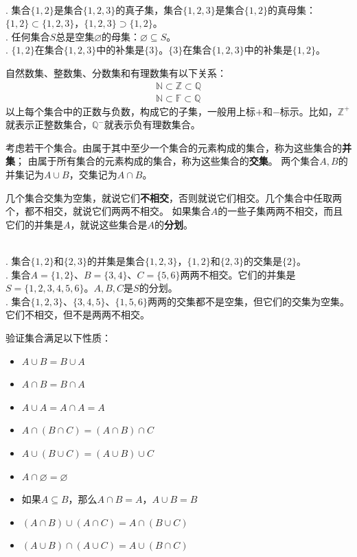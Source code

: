 \begin{ex}\label{ex:2-0-10}
    \mbox{} \\ 
    . 集合$\{1,2\}$是集合$\{1,2,3\}$的真子集，集合$\{1,2,3\}$是集合$\{1,2\}$的真母集：$\{1,2\}\subset \{1,2,3\}$，$\{1,2,3\}\supset \{1,2\}$。\\
    . 任何集合$S$总是空集$\varnothing$的母集：$\varnothing \subseteq S$。\\
    . $\{1,2\}$在集合$\{1,2,3\}$中的补集是$\{3\}$。$\{3\}$在集合$\{1,2,3\}$中的补集是$\{1,2\}$。
\end{ex}

自然数集、整数集、分数集和有理数集有以下关系：
\begin{align*}
    \mathbb{N}\subset\mathbb{Z}\subset\mathbb{Q}  \\
    \mathbb{N}\subset\mathbb{F}\subset\mathbb{Q} 
\end{align*}
以上每个集合中的正数与负数，构成它的子集，一般用上标$+$和$-$标示。比如，$\mathbb{Z}^+$就表示正整数集合，$\mathbb{Q}^-$就表示负有理数集合。

考虑若干个集合。由属于其中至少一个集合的元素构成的集合，称为这些集合的\textbf{并集}；
由属于所有集合的元素构成的集合，称为这些集合的\textbf{交集}。
两个集合$A, B$的并集记为$A\cup B$，交集记为$A\cap B$。

几个集合交集为空集，就说它们\textbf{不相交}，否则就说它们相交。几个集合中任取两个，都不相交，就说它们两两不相交。
如果集合$A$的一些子集两两不相交，而且它们的并集是$A$，就说这些集合是$A$的\textbf{分划}。

\begin{ex}\label{ex:2-0-20}
    \mbox{} \\ 
    . 集合$\{1,2\}$和$\{2,3\}$的并集是集合$\{1,2,3\}$，$\{1,2\}$和$\{2,3\}$的交集是$\{2\}$。\\
    . 集合$A = \{1,2\}$、$B = \{3,4\}$、$C = \{5,6\}$两两不相交。它们的并集是$S = \{1,2,3,4,5,6\}$。$A,B,C$是$S$的分划。\\
    . 集合$ \{1,2,3\}$、$\{3,4,5\}$、$\{1,5,6\}$两两的交集都不是空集，但它们的交集为空集。它们不相交，但不是两两不相交。
\end{ex}

\begin{xt}\label{xt:2-1-0}
    验证集合满足以下性质：
    \begin{itemize}
        \item $A \cup B = B \cup A$
        \item $A \cap B = B \cap A$
        \item $A \cup A = A \cap A = A$
        \item $A \cap (B \cap C) = (A \cap B) \cap C$
        \item $A \cup (B \cup C) = (A \cup B) \cup C$
        \item $A \cap \varnothing = \varnothing$
        \item 如果$A \subseteq B$，那么$A \cap B = A$，$A \cup B = B$
        \item $(A \cap B) \cup (A \cap C) = A \cap (B \cup C)$
        \item $(A \cup B) \cap (A \cup C) = A \cup (B \cap C)$
    \end{itemize}  
\end{xt}

